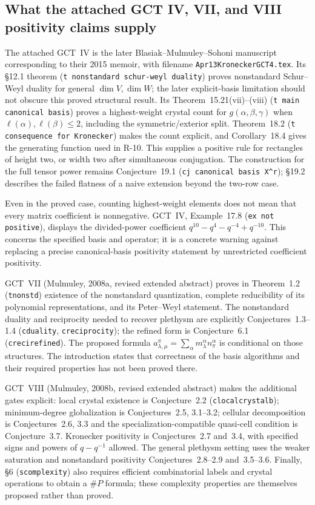 \subsection{What the attached GCT IV, VII, and VIII positivity claims supply}

The attached GCT~IV is the later Blasiak--Mulmuley--Sohoni manuscript
corresponding to their 2015 memoir, with filename
\texttt{Apr13KroneckerGCT4.tex}. Its \S12.1 theorem
(\texttt{t nonstandard schur-weyl duality}) proves nonstandard
Schur--Weyl duality for general $\dim V,\dim W$; the later
explicit-basis limitation should not obscure this proved
structural result. Its Theorem~15.21(vii)--(viii)
(\texttt{t main canonical basis}) proves a highest-weight crystal
count for $g(\alpha,\beta,\gamma)$ when
$\ell(\alpha),\ell(\beta)\leq2$, including the symmetric/exterior
split. Theorem~18.2 (\texttt{t consequence for Kronecker}) makes
the count explicit, and Corollary~18.4 gives the generating
function used in R-10. This supplies a positive rule for rectangles
of height two, or width two after simultaneous conjugation.
The construction for the full tensor power remains Conjecture~19.1
(\texttt{cj canonical basis X\^{}r}); \S19.2 describes the failed
flatness of a naive extension beyond the two-row case.

Even in the proved case, counting highest-weight elements does not
mean that every matrix coefficient is nonnegative. GCT~IV,
Example~17.8 (\texttt{ex not positive}), displays the divided-power
coefficient $q^{10}-q^4-q^{-4}+q^{-10}$. This concerns the specified
basis and operator; it is a concrete warning against replacing a
precise canonical-basis positivity statement by unrestricted
coefficient positivity.

GCT~VII (Mulmuley, 2008a, revised extended abstract) proves in
Theorem~1.2 (\texttt{tnonstd}) existence of the nonstandard
quantization, complete reducibility of its polynomial
representations, and its Peter--Weyl statement. The nonstandard
duality and reciprocity needed to recover plethysm are explicitly
Conjectures~1.3--1.4 (\texttt{cduality}, \texttt{creciprocity});
the refined form is Conjecture~6.1 (\texttt{crecirefined}).
The proposed formula
$a_{\lambda,\mu}^{\pi}=\sum_\alpha
m_\lambda^\alpha n_\pi^\alpha$ is conditional on those structures.
The introduction states that correctness of the basis algorithms
and their required properties has not been proved there.

GCT~VIII (Mulmuley, 2008b, revised extended abstract) makes the
additional gates explicit: local crystal existence is Conjecture~2.2
(\texttt{clocalcrystalb}); minimum-degree globalization is
Conjectures~2.5, 3.1--3.2; cellular decomposition is Conjectures~2.6,
3.3 and the specialization-compatible quasi-cell condition is
Conjecture~3.7. Kronecker positivity is Conjectures~2.7 and~3.4,
with specified signs and powers of $q-q^{-1}$ allowed. The general
plethysm setting uses the weaker saturation and nonstandard
positivity Conjectures~2.8--2.9 and~3.5--3.6. Finally, \S6
(\texttt{scomplexity}) also requires efficient combinatorial
labels and crystal operations to obtain a $\#P$ formula; these
complexity properties are themselves proposed rather than proved.

